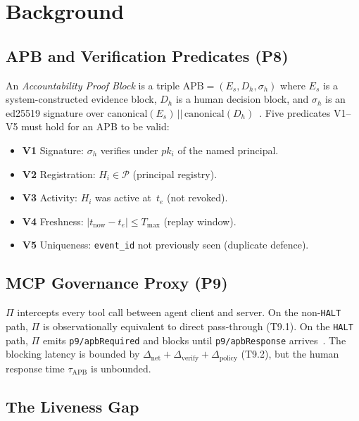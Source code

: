 \documentclass[11pt]{article}
\newcommand{\HALT}{\texttt{HALT}}
\newcommand{\Es}{E_s}
\newcommand{\Dh}{D_h}
\newcommand{\sigh}{\sigma_h}
\newcommand{\Hi}{H_i}
\newcommand{\pki}{pk_i}
\newcommand{\APB}{\mathrm{APB}}
\newcommand{\Proxy}{\Pi}
\newcommand{\Dnet}{\Delta_{\mathrm{net}}}
\newcommand{\Dverify}{\Delta_{\mathrm{verify}}}
\newcommand{\Dpolicy}{\Delta_{\mathrm{policy}}}
\begin{document}
\section{Background}
\label{sec:background}

\subsection{APB and Verification Predicates (P8)}

An \emph{Accountability Proof Block} is a triple
$\APB = (\Es, \Dh, \sigh)$ where $\Es$ is a system-constructed
evidence block, $\Dh$ is a human decision block, and $\sigh$ is an
ed25519 signature over $\mathrm{canonical}(\Es) \,||\,
\mathrm{canonical}(\Dh)$~\citep{fernandez2026ibg}. Five predicates
V1--V5 must hold for an APB to be valid:

\begin{itemize}[itemsep=1pt]
  \item \textbf{V1} Signature: $\sigh$ verifies under $\pki$ of the named principal.
  \item \textbf{V2} Registration: $\Hi \in \mathcal{P}$ (principal registry).
  \item \textbf{V3} Activity: $\Hi$ was active at~$t_e$ (not revoked).
  \item \textbf{V4} Freshness: $|t_{\mathrm{now}} - t_e| \le T_{\mathrm{max}}$ (replay window).
  \item \textbf{V5} Uniqueness: \texttt{event\_id} not previously seen (duplicate defence).
\end{itemize}

\subsection{MCP Governance Proxy (P9)}

$\Proxy$ intercepts every tool call between agent client and server.
On the non-\HALT{} path, $\Proxy$ is observationally equivalent to
direct pass-through (T9.1). On the \HALT{} path, $\Proxy$ emits
\texttt{p9/apbRequired} and blocks until \texttt{p9/apbResponse}
arrives~\citep{fernandez2026mcpgov}. The blocking latency is bounded by
$\Dnet + \Dverify + \Dpolicy$ (T9.2), but the human response time
$\tau_{\mathrm{APB}}$ is unbounded.

\subsection{The Liveness Gap}
\end{document}
